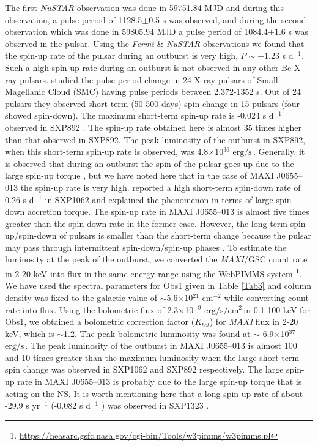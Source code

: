 \documentclass[12pt,a4paper,fleqn,usenatbib]{mnras}
\newcommand{\unitfl}{$\text{erg}/\text{s}/\text{cm}^{2}\,$}
\newcommand{\unilum}{$\text{erg}/\text{s}\,$}
\begin{document}
The first \emph{NuSTAR} observation was done in 59751.84 MJD and during this observation, a pulse period of 1128.5$\pm$0.5 s was observed, and during the second observation which was done in 59805.94 MJD a pulse period of 1084.4$\pm$1.6 s was observed in the pulsar. Using the \emph{Fermi} \& \emph{NuSTAR} observations we found that the spin-up rate of the pulsar during an outburst is very high, $P\sim -1.23$ s d$^{-1}$. Such a high spin-up rate during an outburst is not observed in any other Be X-ray pulsars. \cite{10.1111/j.1365-2966.2009.15631.x} studied the pulse period change in 24 X-ray pulsars of Small Magellanic Cloud (SMC) having pulse periods between 2.372-1352 s. Out of 24 pulsars they observed short-term (50-500 days) spin change in 15 pulsars (four showed spin-down). The maximum short-term spin-up rate is -0.024 s d$^{-1}$ observed in SXP892 \cite{10.1111/j.1365-2966.2009.15631.x}. The spin-up rate obtained here is almost 35 times higher than that observed in SXP892. The peak luminosity of the outburst in SXP892, when this short-term spin-up rate is observed, was 4.8$\times$10$^{36}$ \unilum \citep{10.1111/j.1365-2966.2009.15631.x}. Generally, it is observed that during an outburst the spin of the pulsar goes up due to the large spin-up torque \citep{Bildsten_1997}, but we have noted here that in the case of MAXI J0655--013 the spin-up rate is very high. \cite{2012A&A...537L...1H} reported a high short-term spin-down rate of 0.26 s d$^{-1}$ in SXP1062 and explained the phenomenon in terms of large spin-down accretion torque. The spin-up rate in MAXI J0655--013 is almost five times greater than the spin-down rate in the former case. However, the long-term spin-up/spin-down of pulsars is smaller than the short-term change because the pulsar may pass through intermittent spin-down/spin-up phases \citep{10.1111/j.1365-2966.2009.15631.x}. To estimate the luminosity at the peak of the outburst, we converted the \emph{MAXI}/GSC count rate in 2-20 keV into flux in the same energy range using the WebPIMMS system \footnote{\url{https://heasarc.gsfc.nasa.gov/cgi-bin/Tools/w3pimms/w3pimms.pl}}. We have used the spectral parameters for Obs1 given in Table \ref{Tab3} and column density was fixed to the galactic value of $\sim$5.6$\times$10$^{21}$ cm$^{-2}$ while converting count rate into flux. Using the bolometric flux of 2.3$\times$10$^{-9}$ \unitfl in 0.1-100 keV for Obs1, we obtained a bolometric correction factor ($K_{bol}$) for \emph{MAXI} flux in 2-20 keV, which is $\sim$1.2. The peak bolometric luminosity was found at $\sim$ 6.9$\times$10$^{37}$ \unilum. The peak luminosity of the outburst in MAXI J0655--013 is almost 100 and 10 times greater than the maximum luminosity when the large short-term spin change was observed in SXP1062 \citep{2012A&A...537L...1H} and SXP892 \citep{10.1111/j.1365-2966.2009.15631.x} respectively. The large spin-up rate in MAXI J0655--013 is probably due to the large spin-up torque that is acting on the NS. It is worth mentioning here that a long spin-up rate of about -29.9 s yr$^{-1}$ (-0.082 s d$^{-1}$ ) was observed in SXP1323 \citep{2022A&A...661A..33M}.  
\end{document}
